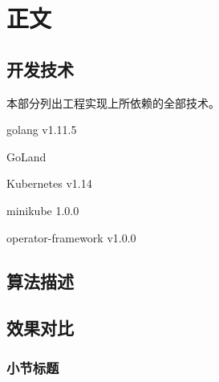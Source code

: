 
\section{正文}

\subsection{开发技术}

本部分列出工程实现上所依赖的全部技术。

golang v1.11.5

GoLand

Kubernetes v1.14

minikube 1.0.0

operator-framework v1.0.0

\subsection{算法描述}

\subsection{效果对比}

\subsubsection{小节标题}

